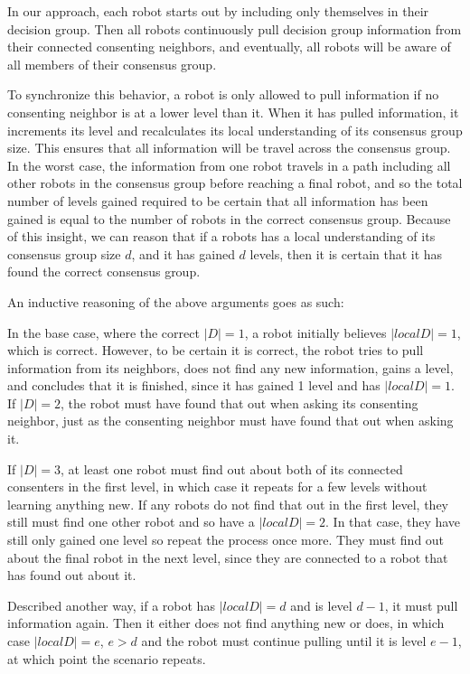 In our approach, each robot starts out by including only themselves in their decision group. Then all robots continuously pull decision group information from their connected consenting neighbors, and eventually, all robots will be aware of all members of their consensus group.

To synchronize this behavior, a robot is only allowed to pull information if no consenting neighbor is at a lower level than it. When it has pulled information, it increments its level and recalculates its local understanding of its consensus group size.
This ensures that all information will be travel across the consensus group. 
In the worst case, the information from one robot travels in a path including all other robots in the consensus group before reaching a final robot, and so the total number of levels gained required to be certain that all information has been gained is equal to the number of robots in the correct consensus group.
Because of this insight, we can reason that if a robots has a local understanding of its consensus group size $d$, and it has gained $d$ levels, then it is certain that it has found the correct consensus group.

An inductive reasoning of the above arguments goes as such: 

In the base case, where the correct $|D| = 1$, a robot initially believes $|localD| = 1$, which is correct. However, to be certain it is correct, the robot tries to pull information from its neighbors, does not find any new information, gains a level, and concludes that it is finished, since it has gained 1 level and has $|localD| = 1$. If $|D| = 2$, the robot must have found that out when asking its consenting neighbor, just as the consenting neighbor must have found that out when asking it. 

If $|D| = 3$, at least one robot must find out about both of its connected consenters in the first level, in which case it repeats for a few levels without learning anything new. If any robots do not find that out in the first level, they still must find one other robot and so have a $|localD| = 2$. In that case, they have still only gained one level so repeat the process once more. They must find out about the final robot in the next level, since they are connected to a robot that has found out about it.

Described another way, if a robot has $|localD| = d$ and is level $d-1$, it must pull information again. Then it either does not find anything new or does, in which case $|localD| = e$, $e > d$ and the robot must continue pulling until it is level $e-1$, at which point the scenario repeats.


